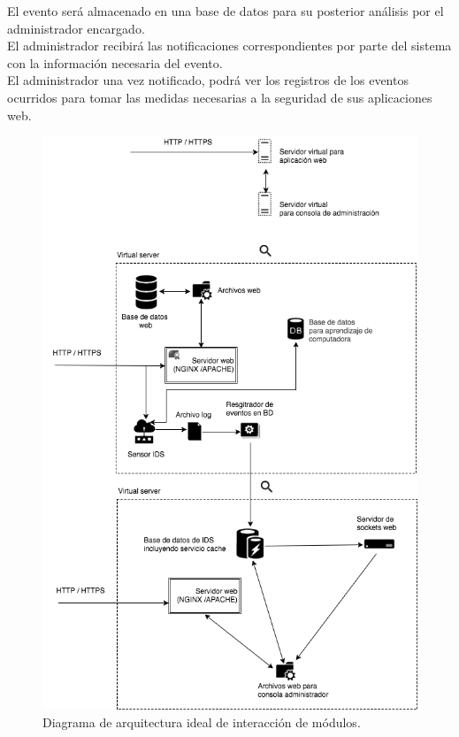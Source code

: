 El evento será almacenado en una base de datos para su posterior análisis por el administrador encargado.\\

El administrador recibirá las notificaciones correspondientes por parte del sistema con la información necesaria del evento.\\

El administrador una vez notificado, podrá ver los registros de los eventos ocurridos para tomar las medidas necesarias a la seguridad de sus aplicaciones web.\\


\begin{figure}
	\centering
	\includegraphics[scale=.6]{images/Diagrama_de_despliegue_1_server}
	\caption{Diagrama de arquitectura ideal de interacción de módulos.}
	\label{fig:arqui_server}
\end{figure}


